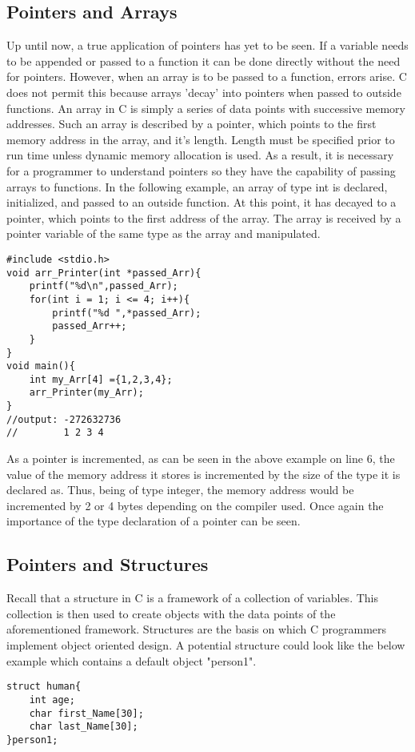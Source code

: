 \documentclass[two column, 10pt]{article}
\begin{document}
\subsection{Pointers and Arrays}
Up until now, a true application of pointers has yet to be seen. If a variable needs to be appended or passed to a function it can be done directly without the need for pointers. However, when an array is to be passed to a function, errors arise. C does not permit this because arrays 'decay' into pointers when passed to outside functions. An array in C is simply a series of data points with successive memory addresses. Such an array is described by a pointer, which points to the first memory address in the array, and it's length. Length must be specified prior to run time unless dynamic memory allocation is used. As a result, it is necessary for a programmer to understand pointers so they have the capability of passing arrays to functions. In the following example, an array of type int is declared, initialized, and passed to an outside function. At this point, it has decayed to a pointer, which points to the first address of the array. The array is received by a pointer variable of the same type as the array and manipulated\cite{T.Jenson}.
\begin{lstlisting}[style=CStyle,
caption={Passing an array to a Function},captionpos=b]
#include <stdio.h>
void arr_Printer(int *passed_Arr){
    printf("%d\n",passed_Arr);
    for(int i = 1; i <= 4; i++){
        printf("%d ",*passed_Arr);
        passed_Arr++; 
    }
}
void main(){
    int my_Arr[4] ={1,2,3,4};
    arr_Printer(my_Arr);
}
//output: -272632736
//        1 2 3 4
\end{lstlisting}
As a pointer is incremented, as can be seen in the above example on line 6, the value of the memory address it stores is incremented by the size of the type it is declared as. Thus, being of type integer, the memory address would be incremented by 2 or 4 bytes depending on the compiler used. Once again the importance of the type declaration of a pointer can be seen.

\subsection{Pointers and Structures}
Recall that a structure in C is a framework of a collection of variables. This collection is then used to create objects with the data points of the aforementioned framework. Structures are the basis on which C programmers implement object oriented design\cite{T.Jenson}. A potential structure could look like the below example which contains a default object "person1".
\begin{lstlisting}[style=CStyle,
caption={Constructing a Structure},captionpos=b]
struct human{
    int age;
    char first_Name[30];
    char last_Name[30];
}person1;
\end{lstlisting}
\end{document}
